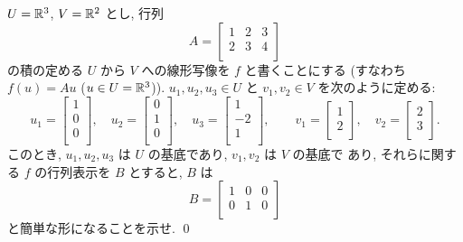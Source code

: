 \documentclass[12pt,twoside]{jarticle}
\begin{document}
\begin{question}
  $U={\mathbb R}^3$, $V={\mathbb R}^2$ とし, 行列 
  \begin{equation*}
    A = 
    \begin{bmatrix}
      1 & 2 & 3 \\
      2 & 3 & 4 \\
    \end{bmatrix}
  \end{equation*}
  の積の定める $U$ から $V$ への線形写像を $f$ と書くことにする
  (すなわち $f(u)=Au$ ($u\in U={\mathbb R}^3$)).
  $u_1,u_2,u_3\in U$ と $v_1,v_2\in V$ を次のように定める:
  \begin{equation*}
    u_1 =
    \begin{bmatrix}
      1 \\ 0 \\ 0 \\
    \end{bmatrix},
    \quad
    u_2 =
    \begin{bmatrix}
      0 \\ 1 \\ 0 \\
    \end{bmatrix},
    \quad
    u_3 =
    \begin{bmatrix}
      1 \\ -2 \\ 1 \\
    \end{bmatrix},
    \qquad
    v_1 =
    \begin{bmatrix}
      1 \\ 2 \\
    \end{bmatrix},
    \quad
    v_2 =
    \begin{bmatrix}
      2 \\ 3 \\
    \end{bmatrix}.
  \end{equation*}
  このとき, $u_1,u_2,u_3$ は $U$ の基底であり, $v_1,v_2$ は $V$ の基底で
  あり, それらに関する $f$ の行列表示を $B$ とすると, $B$ は
  \begin{equation*}
    B =
    \begin{bmatrix}
      1 & 0 & 0 \\
      0 & 1 & 0 \\
    \end{bmatrix}
  \end{equation*}
  と簡単な形になることを示せ. \qed
\end{question}
\end{document}
